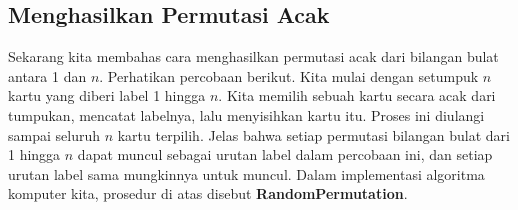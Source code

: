 \subsection*{Menghasilkan Permutasi Acak}
Sekarang kita membahas cara menghasilkan permutasi acak dari bilangan bulat antara 1 dan
$n$.  Perhatikan percobaan berikut.  Kita mulai dengan setumpuk $n$ kartu yang diberi
label 1 hingga $n$.  Kita memilih sebuah kartu secara acak dari tumpukan, mencatat
labelnya, lalu menyisihkan kartu itu.  Proses ini diulangi sampai seluruh $n$ kartu
terpilih.  Jelas bahwa setiap permutasi bilangan bulat dari 1 hingga $n$ dapat muncul
sebagai urutan label dalam percobaan ini, dan setiap urutan label sama mungkinnya untuk
muncul.  Dalam implementasi algoritma komputer kita, prosedur di atas disebut {\bf
RandomPermutation}.  



